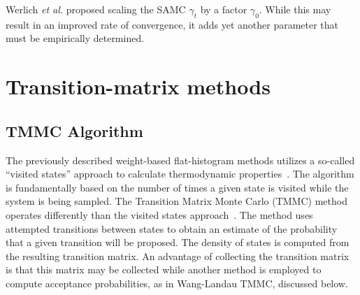 \documentclass[letterpaper,twocolumn,amsmath,amssymb,pre,aps,10pt]{revtex4-1}
\begin{document}
Werlich \emph{et al.} proposed scaling the SAMC $\gamma_t$ by a factor
$\gamma_0$.  While this may result in an improved rate of convergence,
it adds yet another parameter that must be empirically determined.


\section{Transition-matrix methods}\label{sec:transition}

\subsection{TMMC Algorithm}
The previously described weight-based flat-histogram methods utilizes a so-called
``visited states'' approach to calculate  thermodynamic
properties~\cite{errington2003direct}. The algorithm is fundamentally
based on the number of times a given state is visited while the
system is being sampled. The Transition Matrix Monte Carlo (TMMC) method operates
differently than the visited states approach~\cite{fitzgerald2000monte}.
The method uses attempted transitions between states to obtain an estimate of
the probability that a given transition will be proposed.  The density
of states is computed from the resulting transition matrix.  An advantage
of collecting the transition matrix is that this matrix may be collected
while another method is employed to compute acceptance probabilities, as
in Wang-Landau TMMC, discussed below.
\end{document}
